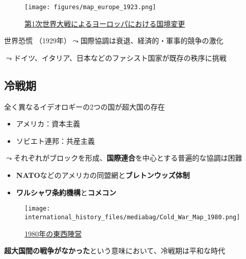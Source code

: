 \documentclass[
  xelatex,
  ja=standard]{bxjsarticle}
\providecommand{\tightlist}{%
  \setlength{\itemsep}{0pt}\setlength{\parskip}{0pt}}\usepackage{longtable,booktabs,array}
\begin{document}
\begin{figure}[htpb]

{\centering \texttt{[image: figures/map\_europe\_1923.png]}

}

\caption{\href{https://commons.wikimedia.org/wiki/File:Map_Europe_1923-en.svg}{第1次世界大戦によるヨーロッパにおける国境変更}}

\end{figure}

世界恐慌 （1929年）\(\leadsto\)国際協調は衰退、経済的・軍事的競争の激化

\(\leadsto\)ドイツ、イタリア、日本などのファシスト国家が既存の秩序に挑戦

\hypertarget{ux51b7ux6226ux671f}{%
\subsection{冷戦期}\label{ux51b7ux6226ux671f}}

全く異なるイデオロギーの2つの国が超大国の存在

\begin{itemize}
\tightlist
\item
  アメリカ：資本主義
\item
  ソビエト連邦：共産主義
\end{itemize}

\(\leadsto\)それぞれがブロックを形成、\textbf{国際連合}を中心とする普遍的な協調は困難

\begin{itemize}
\tightlist
\item
  \textbf{NATO}などのアメリカの同盟網と\textbf{ブレトンウッズ体制}
\item
  \textbf{ワルシャワ条約機構}と\textbf{コメコン}
\end{itemize}

\begin{figure}[htpb]

{\centering \texttt{[image: international\_history\_files/mediabag/Cold\_War\_Map\_1980.png]}

}

\caption{\href{https://commons.wikimedia.org/wiki/File:Cold_War_Map_1980.png}{1980年の東西陣営}}

\end{figure}

\textbf{超大国間の戦争がなかった}という意味において、冷戦期は平和な時代
\end{document}
